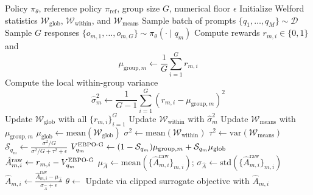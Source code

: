 \documentclass{article}
\theoremstyle{plain}
\theoremstyle{definition}
\theoremstyle{remark}
\newcommand{\oursG}{\textsc{EBPO-G}\xspace}
\begin{document}
\begin{algorithm}[tb]
\caption{EBPO Advantage Estimation (Gaussian Variant)}
\label{alg:EBPO}
\begin{algorithmic}[1]
     Policy $\pi_\theta$, reference policy $\pi_{\mathrm{ref}}$, group size $G$, numerical floor $\epsilon$
    \STATE Initialize Welford statistics $\mathcal W_{\mathrm{glob}}$, $\mathcal W_{\mathrm{within}}$, and $\mathcal W_{\mathrm{means}}$
        \STATE Sample batch of prompts $\{q_1,\dots,q_M\}\sim\mathcal D$
            \STATE Sample $G$ responses $\{o_{m,1},\dots,o_{m,G}\}\sim\pi_\theta(\cdot\mid q_m)$
            \STATE Compute rewards $r_{m,i}\in\{0,1\}$ and
            \[
                \mu_{\mathrm{group},m}
                \gets
                \frac{1}{G}\sum_{i=1}^{G} r_{m,i}
            \]
            \STATE Compute the local within-group variance
            \[
                \hat\sigma_m^2
                \gets
                \frac{1}{G-1}\sum_{i=1}^{G}
                \left(r_{m,i}-\mu_{\mathrm{group},m}\right)^2
            \]
            \STATE Update $\mathcal W_{\mathrm{glob}}$ with all $\{r_{m,i}\}_{i=1}^{G}$
            \STATE Update $\mathcal W_{\mathrm{within}}$ with $\hat\sigma_m^2$
            \STATE Update $\mathcal W_{\mathrm{means}}$ with $\mu_{\mathrm{group},m}$
        \ENDFOR
        \STATE $\mu_{\mathrm{glob}}\gets \mathrm{mean}(\mathcal W_{\mathrm{glob}})$
        \STATE $\sigma^2\gets \mathrm{mean}(\mathcal W_{\mathrm{within}})$ 
        \STATE $\tau^2\gets \mathrm{var}(\mathcal W_{\mathrm{means}})$ 
            \STATE $\mathcal S_{q_m}
            \gets
            \frac{\sigma^2/G}{\sigma^2/G+\tau^2+\epsilon}$
            \STATE $V_{q_m}^{\oursG}
            \gets
            (1-\mathcal S_{q_m})\mu_{\mathrm{group},m}
            +
            \mathcal S_{q_m}\mu_{\mathrm{glob}}$
                \STATE $\hat A_{m,i}^{\mathrm{raw}}
                \gets
                r_{m,i}-V_{q_m}^{\oursG}$
            \ENDFOR
        \ENDFOR
        \STATE $\mu_{\hat A}\gets \mathrm{mean}(\{\hat A_{m,i}^{\mathrm{raw}}\}_{m,i})$;\quad
        $\sigma_{\hat A}\gets \mathrm{std}(\{\hat A_{m,i}^{\mathrm{raw}}\}_{m,i})$
            \STATE $\hat A_{m,i}
            \gets
            \frac{\hat A_{m,i}^{\mathrm{raw}}-\mu_{\hat A}}
            {\sigma_{\hat A}+\epsilon}$
        \ENDFOR
        \STATE $\theta\gets$ Update via clipped surrogate objective with $\hat A_{m,i}$
    \ENDFOR
\end{algorithmic}
\end{algorithm}
\end{document}
